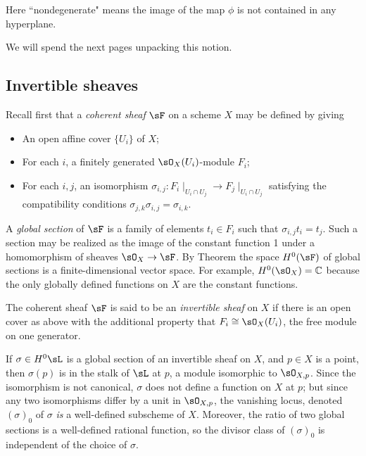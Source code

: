 Here ``nondegenerate" means the image of the map $\phi$ is not contained in any hyperplane. 

We will spend the next pages unpacking this notion.

\subsection{Invertible sheaves}
Recall first that a \emph{coherent sheaf} $\sF$ on a scheme $X$ may be defined by
giving 
\begin{itemize}
 \item An open affine cover $\{U_{i}\}$ of $X$; 
 \item For each $i$, a finitely generated $\sO_{X}(U_{i})$-module $F_{i}$;
 \item For each $i,j$, an isomorphism $\sigma_{i,j}: F_{i}\mid_{U_{i}\cap U_{j}} \to F_{j}\mid_{U_{i}\cap U_{j}}$
 satisfying the compatibility conditions $\sigma_{j,k}\sigma_{i,j} = \sigma_{i,k}$. 
 \end{itemize}

A \emph{global section} of $\sF$ is a family of elements $t_{i}\in F_{i}$ such that 
$\sigma_{i,j} t_{i} = t_{j}$. Such a section may be realized as the image of the constant function 1 under
a homomorphism of sheaves $\sO_{X} \to \sF$. By Theorem \cite[Thm III.5.2]{H} the space $H^{0}(\sF)$  of global sections is
a finite-dimensional vector space. For example, $H^{0}(\sO_{X}) = \CC$ because the only globally defined
functions on $X$ are the constant functions.

The coherent sheaf $\sF$ is said to be an \emph{invertible sheaf} on $X$ if there is an open cover as above with the additional property
that $F_{i} \cong \sO_X(U_{i})$, the free module on one generator. 

If $\sigma \in H^0\sL$ is a global section of an invertible sheaf
on $X$, and $p\in X$ is a point, then $\sigma(p)$ is in the stalk of $\sL$ at $p$, a module isomorphic to $\sO_{X,p}$. Since the isomorphism is not canonical, $\sigma$ does not define a function on $X$ at $p$; but since any two isomorphisms
differ by a unit in $\sO_{X,p}$, the vanishing locus, denoted $(\sigma)_0$ of $\sigma$ \emph{is} a well-defined subscheme of $X$. Moreover, the ratio of two global sections is a well-defined rational function, so the divisor class of 
$(\sigma)_0$ is independent of the choice of $\sigma$.

